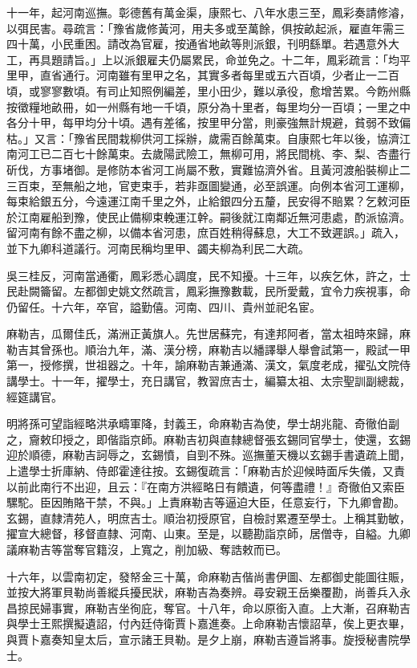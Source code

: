 \begin{pinyinscope}
十一年，起河南巡撫。彰德舊有萬金渠，康熙七、八年水患三至，鳳彩奏請修濬，以弭民害。尋疏言：「豫省歲修黃河，用夫多或至萬餘，俱按畝起派，雇直年需三四十萬，小民重困。請改為官雇，按通省地畝等則派銀，刊明繇單。若遇意外大工，再具題請旨。」上以派銀雇夫仍屬累民，命並免之。十二年，鳳彩疏言：「均平里甲，直省通行。河南雖有里甲之名，其實多者每里或五六百頃，少者止一二百頃，或寥寥數頃。有司止知照例編差，里小田少，難以承役，愈增苦累。今飭州縣按徵糧地畝冊，如一州縣有地一千頃，原分為十里者，每里均分一百頃；一里之中各分十甲，每甲均分十頃。遇有差徭，按里甲分當，則豪強無計規避，貧弱不致偏枯。」又言：「豫省民間栽柳供河工採辦，歲需百餘萬束。自康熙七年以後，協濟江南河工已二百七十餘萬束。去歲陽武險工，無柳可用，將民間桃、李、梨、杏盡行斫伐，方事堵御。是修防本省河工尚屬不敷，實難協濟外省。且黃河渡船裝柳止二三百束，至無船之地，官吏束手，若非亟圖變通，必至誤運。向例本省河工運柳，每束給銀五分，今遠運江南千里之外，止給銀四分五釐，民安得不賠累？乞敕河臣於江南雇船到豫，使民止備柳束輓運江幹。嗣後就江南鄰近無河患處，酌派協濟。留河南有餘不盡之柳，以備本省河患，庶百姓稍得蘇息，大工不致遲誤。」疏入，並下九卿科道議行。河南民稱均里甲、蠲夫柳為利民二大疏。

吳三桂反，河南當通衢，鳳彩悉心調度，民不知擾。十三年，以疾乞休，許之，士民赴闕籥留。左都御史姚文然疏言，鳳彩撫豫數載，民所愛戴，宜令力疾視事，命仍留任。十六年，卒官，謚勤僖。河南、四川、貴州並祀名宦。

麻勒吉，瓜爾佳氏，滿洲正黃旗人。先世居蘇完，有達邦阿者，當太祖時來歸，麻勒吉其曾孫也。順治九年，滿、漢分榜，麻勒吉以繙譯舉人舉會試第一，殿試一甲第一，授修撰，世祖器之。十年，諭麻勒吉兼通滿、漢文，氣度老成，擢弘文院侍講學士。十一年，擢學士，充日講官，教習庶吉士，編纂太祖、太宗聖訓副總裁，經筵講官。

明將孫可望詣經略洪承疇軍降，封義王，命麻勒吉為使，學士胡兆龍、奇徹伯副之，齎敕印授之，即偕詣京師。麻勒吉初與直隸總督張玄錫同官學士，使還，玄錫迎於順德，麻勒吉訶辱之，玄錫憤，自剄不殊。巡撫董天機以玄錫手書遺疏上聞，上遣學士折庫納、侍郎霍達往按。玄錫復疏言：「麻勒吉於迎候時面斥失儀，又責以前此南行不出迎，且云：『在南方洪經略日有饋遺，何等盡禮！』奇徹伯又索臣騾駝。臣因賄賂干禁，不與。」上責麻勒吉等逼迫大臣，任意妄行，下九卿會勘。玄錫，直隸清苑人，明庶吉士。順治初授原官，自檢討累遷至學士。上稱其勤敏，擢宣大總督，移督直隸、河南、山東。至是，以聽勘詣京師，居僧寺，自縊。九卿議麻勒吉等當奪官籍沒，上寬之，削加級、奪誥敕而已。

十六年，以雲南初定，發帑金三十萬，命麻勒吉偕尚書伊圖、左都御史能圖往賑，並按大將軍貝勒尚善縱兵擾民狀，麻勒吉為奏辨。尋安親王岳樂覆勘，尚善兵入永昌掠民婦事實，麻勒吉坐徇庇，奪官。十八年，命以原銜入直。上大漸，召麻勒吉與學士王熙撰擬遺詔，付內廷侍衛賈卜嘉進奏。上命麻勒吉懷詔草，俟上更衣畢，與賈卜嘉奏知皇太后，宣示諸王貝勒。是夕上崩，麻勒吉遵旨將事。旋授秘書院學士。


\end{pinyinscope}
